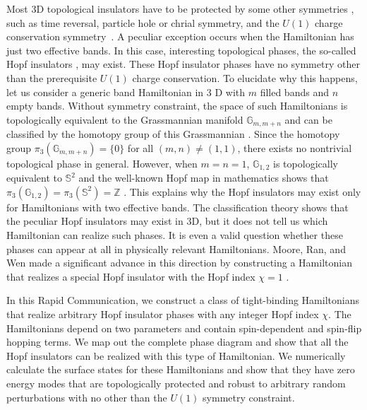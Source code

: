 \documentclass[twocolumn,prb,aps,epsfig,superscriptaddress,showpacs]{revtex4-1}
\begin{document}
Most 3D topological insulators have to be protected by some other symmetries
\cite{2008Schnyder,2009Kitaev}, such as time reversal, particle hole or
chrial symmetry, and the $U(1)$ charge conservation symmetry~\cite%
{2013Budich}. A peculiar exception occurs when the Hamiltonian has just two
effective bands. In this case, interesting topological phases, the so-called
Hopf insulators \cite{2008Moore}, may exist. These Hopf insulator phases
have no symmetry other than the prerequisite $U(1)$ charge conservation. To
elucidate why this happens, let us consider a generic band Hamiltonian in $3$%
D with $m$ filled bands and $n$ empty bands. Without symmetry constraint,
the space of such Hamiltonians is topologically equivalent to the
Grassmannian manifold $\mathbb{G}_{m,m+n}$ and can be classified by the
homotopy group of this Grassmannian \cite{2008Schnyder}. Since the homotopy
group $\pi _{3}(\mathbb{G}_{m,m+n})=\{0\}$ for all $(m,n)\neq (1,1)$, there
exists no nontrivial topological phase in general. However, when $m=n=1$, $%
\mathbb{G}_{1,2}$ is topologically equivalent to $\mathbb{S}^{2}$ and the
well-known Hopf map in mathematics shows that $\pi _{3}(\mathbb{G}%
_{1,2})=\pi _{3}(\mathbb{S}^{2})=\mathbb{Z}$ \cite{2003Nakahara}. This
explains why the Hopf insulators may exist only for Hamiltonians with two
effective bands. The classification theory shows that the peculiar Hopf
insulators may exist in $3$D, but it does not tell us which Hamiltonian can
realize such phases. It is even a valid question whether these phases can
appear at all in physically relevant Hamiltonians. Moore, Ran, and Wen made
a significant advance in this direction by constructing a Hamiltonian that
realizes a special Hopf insulator with the Hopf index $\chi =1$ \cite%
{2008Moore}.

In this Rapid Communication, we construct a class of tight-binding
Hamiltonians that realize arbitrary Hopf insulator phases with any integer
Hopf index $\chi $. The Hamiltonians depend on two parameters and contain
spin-dependent and spin-flip hopping terms. We map out the complete phase
diagram and show that all the Hopf insulators can be realized with this type
of Hamiltonian. We numerically calculate the surface states for these
Hamiltonians and show that they have zero energy modes that are
topologically protected and robust to arbitrary random perturbations with no
other than the $U(1)$ symmetry constraint.
\end{document}

